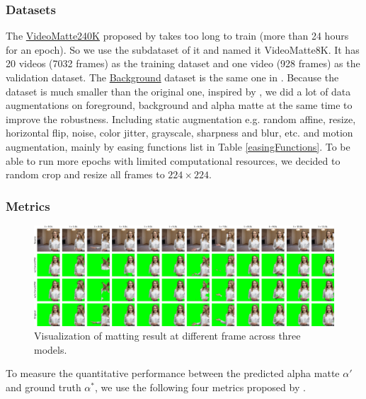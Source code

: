 \documentclass[final]{cvpr}
\begin{document}
\subsubsection{Datasets}

The \href{https://grail.cs.washington.edu/projects/background-matting-v2/#/datasets}{VideoMatte240K} proposed by \cite{linRealTimeHighResolutionBackground2020a} takes too long to train (more than 24 hours for an epoch).
So we use the subdataset of it and named it VideoMatte8K.
It has 20 videos (7032 frames) as the training dataset and one video (928 frames) as the validation dataset.
The \href{https://grail.cs.washington.edu/projects/background-matting-v2/#/datasets}{Background} dataset is the same one in \cite{linRealTimeHighResolutionBackground2020a}. Because the dataset is much smaller than the original one, inspired by \cite{linRobustHighResolutionVideo2021}, we did a lot of data augmentations on foreground, background and alpha matte at the same time to improve the robustness.
Including static augmentation e.g. random affine, resize, horizontal flip, noise, color jitter, grayscale, sharpness and blur, etc. and motion augmentation, mainly by easing functions list in Table \ref{easingFunctions}.
To be able to run more epochs with limited computational resources, we decided to random crop and resize all frames to $224 \times 224$.

\subsubsection{Metrics}

\begin{figure}[t]
    \begin{center}
        \includegraphics[width=1\textwidth]{img/visual.pdf}
    \end{center}
    \caption{Visualization of matting result at different frame across three models.}
    \label{visual}
\end{figure}

To measure the quantitative performance between the predicted alpha matte $\alpha'$ and ground truth $\alpha^*$, we use the following four metrics proposed by \cite{Rhemann2009APM}.
\end{document}
